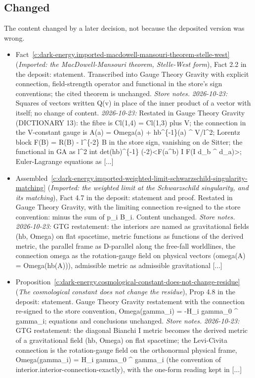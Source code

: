 \documentclass[11pt]{article}
\theoremstyle{definition}
\theoremstyle{plain}
\begin{document}
\subsection*{Changed}
The content changed by a later decision, not because the deposited version was wrong.
\begin{itemize}\setlength{\itemsep}{2pt}
\item Fact~\ref{c:dark-energy.imported-macdowell-mansouri-theorem-stelle-west} (\emph{Imported: the MacDowell-Mansouri theorem, Stelle-West form}), Fact 2.2 in the deposit: statement. Transcribed into Gauge Theory Gravity with explicit connection, field-strength operator and functional in the store's sign conventions; the cited theorem is unchanged. \emph{Store notes.} \emph{2026-10-23:} Squares of vectors written Q(v) in place of the inner product of a vector with itself; no change of content. \emph{2026-10-23:} Restated in Gauge Theory Gravity (DICTIONARY 13): the fibre is Cl(1,4) = Cl(1,3) plus V; the connection in the V-constant gauge is A(a) = Omega(a) + hb\^{}\{-1\}(a) \^{} V/l\^{}2; Lorentz block F(B) = R(B) - l\^{}\{-2\} B in the store sign, vanishing on de Sitter; the functional in GA as l\^{}2 int det(hb)\^{}\{-1\} (-2)<F(a\^{}b) I F(I d\_b \^{} d\_a)>; Euler-Lagrange equations as [...]
\item Assembled~\ref{c:dark-energy.imported-weighted-limit-schwarzschild-singularity-matching} (\emph{Imported: the weighted limit at the Schwarzschild singularity, and its matching}), Fact 4.7 in the deposit: statement and proof. Restated in Gauge Theory Gravity, with the limiting connection re-signed to the store convention: minus the sum of p\_i B\_i. Content unchanged. \emph{Store notes.} \emph{2026-10-23:} GTG restatement: the interiors are named as gravitational fields (hb, Omega) on flat spacetime, metric functions as functions of the derived metric, the parallel frame as D-parallel along the free-fall worldlines, the connection omega as the rotation-gauge field on physical vectors (omega(A) = Omega(hb(A))), admissible metric as admissible gravitational [...]
\item Proposition~\ref{c:dark-energy.cosmological-constant-does-not-change-residue} (\emph{The cosmological constant does not change the residue}), Prop 4.8 in the deposit: statement. Gauge Theory Gravity restatement with the connection re-signed to the store convention, Omega(gamma\_i) = -H\_i gamma\_0 \^{} gamma\_i; equations and conclusions unchanged. \emph{Store notes.} \emph{2026-10-23:} GTG restatement: the diagonal Bianchi I metric becomes the derived metric of a gravitational field (hb, Omega) on flat spacetime; the Levi-Civita connection is the rotation-gauge field on the orthonormal physical frame, Omega(gamma\_i) = H\_i gamma\_0 \^{} gamma\_i (the convention of interior.interior-connection-exactly), with the one-form reading kept in [...]

\end{itemize}
\end{document}
